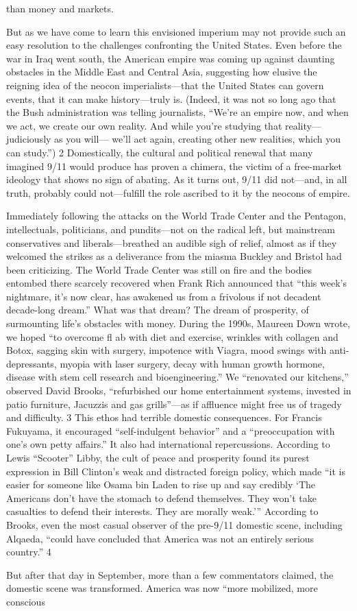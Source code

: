 than money and markets.{\par} But as we have come to learn this envisioned imperium may not provide such an easy resolution to the challenges confronting the United States. Even before the war in Iraq went south, the American empire was coming up against daunting obstacles in the Middle East and Central Asia, suggesting how elusive the reigning idea of the neocon imperialists—that the United States can govern events, that it can make history—truly is. (Indeed, it was not so long ago that the Bush administration was telling journalists, “We’re an empire now, and when we act, we create our own reality. And while you’re studying that reality—judiciously as you will— we’ll act again, creating other new realities, which you can study.”) {\color{blue} 2 } Domestically, the cultural and political renewal that many imagined 9/11 would produce has proven a chimera, the victim of a free-market ideology that shows no sign of abating. As it turns out, 9/11 did not—and, in all truth, probably could not—fulfill the role ascribed to it by the neocons of empire.{\par} Immediately following the attacks on the World Trade Center and the Pentagon, intellectuals, politicians, and pundits—not on the radical left, but mainstream conservatives and liberals—breathed an audible sigh of relief, almost as if they welcomed the strikes as a deliverance from the miasma Buckley and Bristol had been criticizing. The World Trade Center was still on fire and the bodies entombed there scarcely recovered when Frank Rich announced that “this week’s nightmare, it’s now clear, has awakened us from a frivolous if not decadent decade-long dream.” What was that dream? The dream of prosperity, of surmounting life’s obstacles with money. During the 1990s, Maureen Down wrote, we hoped “to overcome fl ab with diet and exercise, wrinkles with collagen and Botox, sagging skin with surgery, impotence with Viagra, mood swings with anti-depressants, myopia with laser surgery, decay with human growth hormone, disease with stem cell research and bioengineering.” We “renovated our kitchens,” observed David Brooks, “refurbished our home entertainment systems, invested in patio furniture, Jacuzzis and gas grills”—as if affluence might free us of tragedy and difficulty. {\color{blue} 3 } This ethos had terrible domestic consequences. For Francis Fukuyama, it encouraged “self-indulgent behavior” and a “preoccupation with one’s own petty affairs.” It also had international repercussions. According to Lewis “Scooter” Libby, the cult of peace and prosperity found its purest expression in Bill Clinton’s weak and distracted foreign policy, which made “it is easier for someone like Osama bin Laden to rise up and say credibly ‘The Americans don’t have the stomach to defend themselves. They won’t take casualties to defend their interests. They are morally weak.’” According to Brooks, even the most casual observer of the pre-9/11 domestic scene, including Alqaeda, “could have concluded that America was not an entirely serious country.” {\color{blue} 4 } {\par} But after that day in September, more than a few commentators claimed, the domestic scene was transformed. America was now “more mobilized, more conscious 